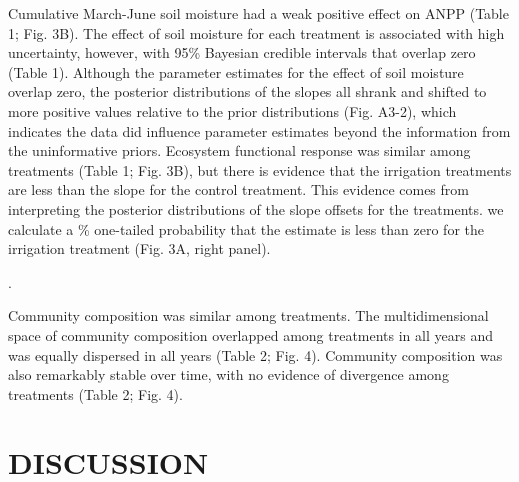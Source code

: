 \documentclass[fleqn,10pt,lineno]{wlpeerj} %
\begin{document}
Cumulative March-June soil moisture had a weak positive effect on ANPP
(Table 1; Fig. 3B). The effect of soil moisture for each treatment is
associated with high uncertainty, however, with 95\% Bayesian credible
intervals that  overlap zero (Table 1). Although the
parameter estimates for the effect of soil moisture overlap zero, the
posterior distributions of the slopes all shrank and shifted to more
positive values relative to the prior distributions (Fig. A3-2), which
indicates the data did influence parameter estimates beyond the
information from the uninformative priors. Ecosystem functional response
was similar among treatments (Table 1; Fig. 3B), but there is evidence
that the  irrigation treatments are less
than the slope for the control treatment. This evidence comes from
interpreting the posterior distributions of the slope offsets for the
treatments.  we calculate a \%
one-tailed probability that the estimate is less than zero for the
irrigation treatment
(Fig. 3A, right panel).

.

Community composition was similar among treatments. The multidimensional
space of community composition overlapped among treatments in all years
and was equally dispersed in all years (Table 2; Fig. 4). Community
composition was also remarkably stable over time, with no evidence of
divergence among treatments (Table 2; Fig. 4).

\section{DISCUSSION}\label{discussion}
\end{document}
